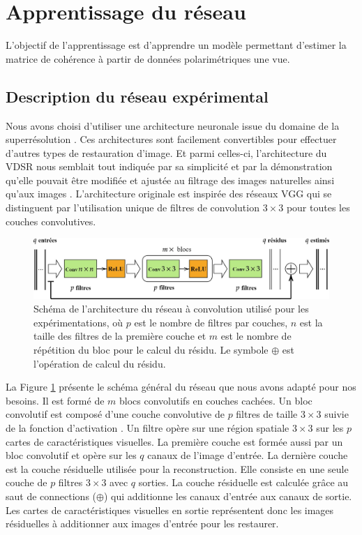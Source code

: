 \section{Apprentissage du réseau}  \label{sec:experimental_protocol}

L'objectif de l'apprentissage est d'apprendre un modèle permettant d'estimer la matrice de cohérence à partir de données polarimétriques une vue.

\subsection{Description du réseau expérimental} \label{sec:description_cnn}

Nous avons choisi d'utiliser une architecture neuronale issue du domaine de la superrésolution \cite{Yang2018DeepLF}.  Ces architectures sont facilement convertibles pour effectuer d'autres types de restauration d'image. Et parmi celles-ci, l'architecture du VDSR\cite{Kim_2016_VDSR} nous semblait tout indiquée par sa simplicité et par la démonstration qu'elle pouvait être modifiée et ajustée au filtrage des images naturelles ainsi qu'aux images \acrsarns.  L'architecture originale est inspirée des réseaux VGG \cite{vgg} qui se distinguent par l'utilisation unique de filtres de convolution $3\times3$ pour toutes les couches convolutives.  

\begin{figure}
  \includegraphics[width=1.0\linewidth]{figures/Chap3/cnn-experiment.jpg}
  \centering
  \caption{
  \small{Schéma de l'architecture du réseau à convolution utilisé pour les expérimentations, où $p$ est le nombre de filtres par couches, $n$ est la taille des filtres de la première couche et $m$ est le nombre de répétition du bloc pour le calcul du résidu. Le symbole $\oplus$ est l'opération de calcul du résidu.}
  }
  \label{fig:cnn-experiment-diagram}
\end{figure}

La Figure \ref{fig:cnn-experiment-diagram} présente le schéma général du réseau que nous avons adapté pour nos besoins. Il est formé de $m$ blocs convolutifs en couches cachées. Un bloc convolutif est composé  d'une couche convolutive de $p$ filtres de taille $3\times3$ suivie de la fonction d'activation \acrreluns. Un filtre opère sur une région spatiale $3\times3$ sur les $p$ cartes de caractéristiques visuelles.  La première couche est formée aussi par un bloc convolutif et opère sur les $q$ canaux de l'image d'entrée.   La dernière couche est la couche résiduelle utilisée pour la reconstruction. Elle consiste en une seule couche de $p$ filtres $3\times3$ avec $q$ sorties. La couche résiduelle est calculée grâce au saut de connections ($\oplus$) qui additionne les canaux d'entrée aux canaux de sortie.  Les cartes de caractéristiques visuelles en sortie représentent donc les images résiduelles à additionner aux images d'entrée pour les restaurer.

